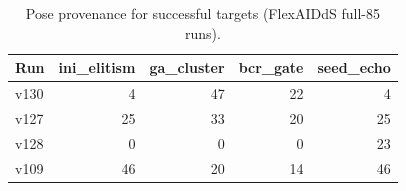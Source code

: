 \begin{table}[h]
\centering
\caption{Pose provenance for successful targets (FlexAIDdS full-85 runs).}
\label{tab:astex-pose-source}
\small
\begin{tabular}{@{}lrrrr@{}}
\toprule
\textbf{Run} & \textbf{ini\_elitism} & \textbf{ga\_cluster} & \textbf{bcr\_gate} & \textbf{seed\_echo} \\
\midrule
v130 & 4 & 47 & 22 & 4 \\
v127 & 25 & 33 & 20 & 25 \\
v128 & 0 & 0 & 0 & 23 \\
v109 & 46 & 20 & 14 & 46 \\
\bottomrule
\end{tabular}
\end{table}
